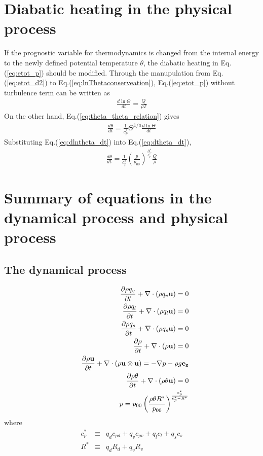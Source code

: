 \section{Diabatic heating in the physical process}

If the prognostic variable for thermodynamics is changed
from the internal energy to the newly defined potential temperature $\theta$,
the diabatic heating in Eq.(\ref{eq:etot_p}) should be modified.
Through
the manupulation from Eq.(\ref{eq:etot_d2}) to Eq.(\ref{eq:lnThetaconserveation}),
Eq.(\ref{eq:etot_p}) without turbulence term can be written as
\begin{eqnarray}
  \frac{d \ln \Theta}{dt} = \frac{Q}{\rho T}
  \label{eq:dlntheta_dt}
\end{eqnarray}
On the other hand, Eq.(\ref{eq:theta_theta_relation}) gives
\begin{eqnarray}
  \frac{d \theta}{dt} = \frac{1}{c_p^*} \Theta^{1/a} \frac{d \ln \Theta}{dt} 
  \label{eq:dtheta_dt}
\end{eqnarray}
Substituting Eq.(\ref{eq:dlntheta_dt}) into Eq.(\ref{eq:dtheta_dt}),
\begin{eqnarray}
  \frac{d \theta}{dt} = \frac{1}{c_p^*} 
  \left(\frac{p}{p_{00}}\right)^{\frac{R^*}{c_p^*}} \frac{Q}{\rho}
\end{eqnarray}

\section{Summary of equations in the dynamical process and physical process}
\subsection{The dynamical process}
\begin{eqnarray}
&&  \frac{\partial \rho q_v}{\partial t}
+ \nabla \cdot\left(\rho q_v {\bf u}\right)  = 0
\label{eq:rho_v_d2}\\
&&  \frac{\partial \rho q_l}{\partial t}
+ \nabla \cdot\left(\rho q_l {\bf u}\right) = 0
\label{eq:rho_l_d2}\\
&&  \frac{\partial \rho q_s}{\partial t}
+ \nabla \cdot\left(\rho q_s {\bf u}\right)
= 0
\label{eq:rho_s_d2}\\
&&  \frac{\partial \rho}{\partial t}
+ \nabla\cdot\left(\rho{\bf u}\right) 
=0 \label{eq:rhotot_d2}\\
&&  \frac{\partial \rho {\bf u}}{\partial t}
+ \nabla \cdot \left(\rho{\bf u} \otimes {\bf u}\right)  
= 
-\nabla p - \rho g {\bf e_z} \label{eq:momtot_d2}\\
&&  \frac{\partial \rho \theta  }{\partial t}
+  \nabla \cdot \left( \rho \theta {\bf u} \right) =  0 \label{eq:etot_d2}\\
&& p=p_{00}\left(\frac{\rho \theta R^*}{p_{00}} \right)^{\frac{c_{p}^*}{c_{p}^*- R^*}}
\end{eqnarray}
where 
\begin{eqnarray}
  c_p^* &\equiv& q_d c_{pd} +q_vc_{pv}+q_lc_l+q_sc_s\\
  R^* &\equiv& q_d R_d + q_v R_v
\end{eqnarray}

